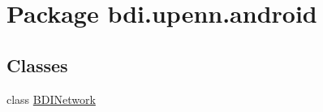 \hypertarget{namespacebdi_1_1upenn_1_1android}{\section{Package bdi.\-upenn.\-android}
\label{namespacebdi_1_1upenn_1_1android}
}
\subsection*{Classes}
\begin{DoxyCompactItemize}
\item 
class \hyperlink{classbdi_1_1upenn_1_1android_1_1_b_d_i_network}{B\-D\-I\-Network}
\end{DoxyCompactItemize}
